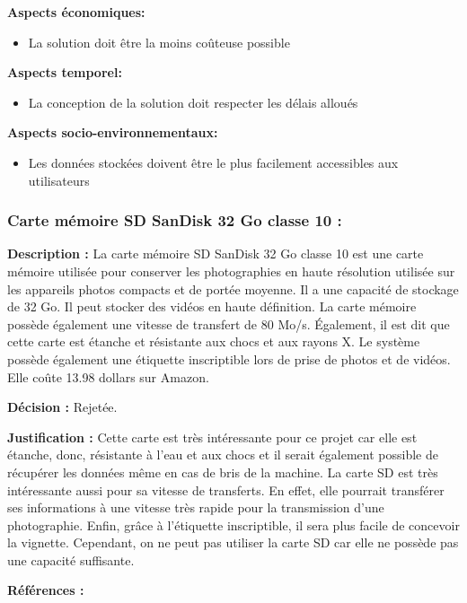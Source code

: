 \textbf{Aspects économiques:}
\begin{itemize} [label = {--}]
    \item La solution doit être la moins coûteuse possible
\end{itemize}

\textbf{Aspects temporel:}
\begin{itemize} [label = {--}]
    \item La conception de la solution doit respecter les délais alloués
\end{itemize}

\textbf{Aspects socio-environnementaux:}
\begin{itemize} [label = {--}]
    \item Les données stockées doivent être le plus facilement accessibles aux utilisateurs
\end{itemize}

\subsubsection{Carte mémoire SD SanDisk 32 Go classe 10 :}

\textbf{Description :} La carte mémoire SD SanDisk 32 Go classe 10 est une carte mémoire utilisée pour conserver les photographies en haute résolution utilisée sur les appareils photos compacts et de portée moyenne. Il a une capacité de stockage de 32 Go. Il peut stocker des vidéos en haute définition. La carte mémoire possède également une vitesse de transfert de 80 Mo/s. Également, il est dit que cette carte est étanche et résistante aux chocs et aux rayons X. Le système possède également une étiquette inscriptible lors de prise de photos et de vidéos. Elle coûte 13.98 dollars sur Amazon.

\textbf{Décision :} Rejetée.

\textbf{Justification :} Cette carte est très intéressante pour ce projet car elle est étanche, donc, résistante à l’eau et aux chocs et il serait également possible de récupérer les données même en cas de bris de la machine. La carte SD est très intéressante aussi pour sa vitesse de transferts. En effet, elle pourrait transférer ses informations à une vitesse très rapide pour la transmission d’une photographie. Enfin, grâce à l’étiquette inscriptible, il sera plus facile de concevoir la vignette. Cependant, on ne peut pas utiliser la carte SD car elle ne possède pas une capacité suffisante.

\textbf{Références :} \cite{casd} \cite{amsd}

